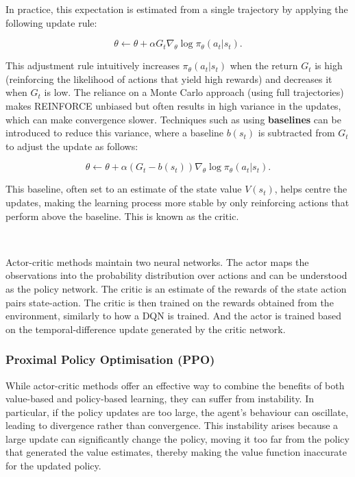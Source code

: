 \documentclass{article}
\begin{document}
In practice, this expectation is estimated from a single trajectory by applying the following update rule:

\begin{equation}
\theta \leftarrow \theta + \alpha G_t \nabla_\theta \log \pi_\theta(a_t | s_t).
\end{equation}

This adjustment rule intuitively increases $\pi_\theta(a_t | s_t)$ when the return $G_t$ is high (reinforcing the likelihood of actions that yield high rewards) and decreases it when $G_t$ is low. The reliance on a Monte Carlo approach (using full trajectories) makes REINFORCE unbiased but often results in high variance in the updates, which can make convergence slower. Techniques such as using \textbf{baselines} can be introduced to reduce this variance, where a baseline $b(s_t)$ is subtracted from $G_t$ to adjust the update as follows:

\begin{equation}
\theta \leftarrow \theta + \alpha (G_t - b(s_t)) \nabla_\theta \log \pi_\theta(a_t | s_t).
\end{equation}

This baseline, often set to an estimate of the state value $V(s_t)$, helps centre the updates, making the learning process more stable by only reinforcing actions that perform above the baseline. This is known as the critic.

\

Actor-critic methods maintain two neural networks. The actor maps the observations into the probability distribution over actions and can be understood as the policy network. The critic is an estimate of the rewards of the state action pairs state-action. The critic is then trained on the rewards obtained from the environment, similarly to how a DQN is trained. And the actor is trained based on the temporal-difference update generated by the critic network. 

\subsubsection{Proximal Policy Optimisation (PPO)}

While actor-critic methods offer an effective way to combine the benefits of both value-based and policy-based learning, they can suffer from instability. In particular, if the policy updates are too large, the agent's behaviour can oscillate, leading to divergence rather than convergence. This instability arises because a large update can significantly change the policy, moving it too far from the policy that generated the value estimates, thereby making the value function inaccurate for the updated policy.
\end{document}

